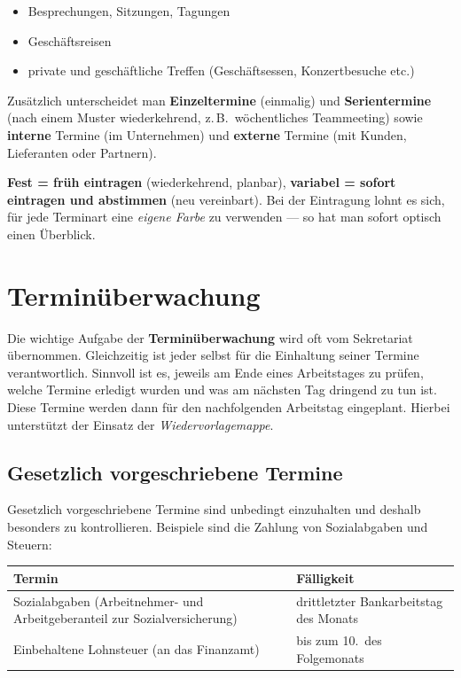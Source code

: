 \documentclass[11pt, a4paper]{article}
\begin{document}
\begin{itemize}
  \item Besprechungen, Sitzungen, Tagungen
  \item Geschäftsreisen
  \item private und geschäftliche Treffen (Geschäftsessen, Konzertbesuche etc.)
\end{itemize}

\medskip
Zusätzlich unterscheidet man \textbf{Einzeltermine} (einmalig) und \textbf{Serientermine}
(nach einem Muster wiederkehrend, z.\,B.\ wöchentliches Teammeeting) sowie
\textbf{interne} Termine (im Unternehmen) und \textbf{externe} Termine (mit Kunden,
Lieferanten oder Partnern).

\begin{merksatz}
\textbf{Fest = früh eintragen} (wiederkehrend, planbar), \textbf{variabel = sofort
eintragen und abstimmen} (neu vereinbart). Bei der Eintragung lohnt es sich, für jede
Terminart eine \emph{eigene Farbe} zu verwenden --- so hat man sofort optisch einen
Überblick.
\end{merksatz}

\section{Terminüberwachung}

Die wichtige Aufgabe der \textbf{Terminüberwachung} wird oft vom Sekretariat übernommen.
Gleichzeitig ist jeder selbst für die Einhaltung seiner Termine verantwortlich. Sinnvoll
ist es, jeweils am Ende eines Arbeitstages zu prüfen, welche Termine erledigt wurden und
was am nächsten Tag dringend zu tun ist. Diese Termine werden dann für den nachfolgenden
Arbeitstag eingeplant. Hierbei unterstützt der Einsatz der \emph{Wiedervorlagemappe}.

\subsection{Gesetzlich vorgeschriebene Termine}

Gesetzlich vorgeschriebene Termine sind unbedingt einzuhalten und deshalb besonders zu
kontrollieren. Beispiele sind die Zahlung von Sozialabgaben und Steuern:

\begin{center}
\begin{tabular}{p{8cm} p{5cm}}
\toprule
\textbf{Termin} & \textbf{Fälligkeit}\\
\midrule
Sozialabgaben (Arbeitnehmer- und Arbeitgeberanteil zur Sozialversicherung) & drittletzter Bankarbeitstag des Monats\\
Einbehaltene Lohnsteuer (an das Finanzamt) & bis zum 10.\ des Folgemonats\\
\bottomrule
\end{tabular}
\end{center}
\end{document}
